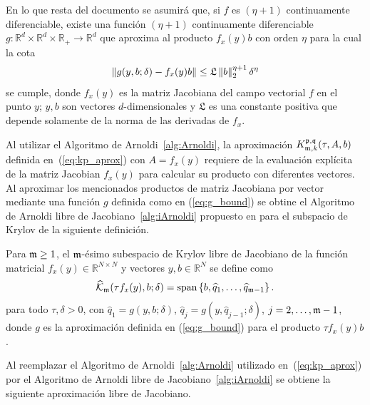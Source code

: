 En lo que resta del documento se asumirá que, si $f$ es $(\eta+1)$  continuamente diferenciable, existe una función $(\eta+1)$ continuamente diferenciable $g: \mathbb{R}^{d}\times \mathbb{R}^{d} \times \mathbb{R}_+ \to \mathbb{R}^{d}$ que aproxima al producto $f_x(y)b$ con orden $\eta$ para la cual la cota
\begin{equation} \label{eq:g_bound}
	\left\lVert g(y,b;\delta)-f_x(y)b \right\rVert \leq \mathfrak{L}\left\lVert b \right\rVert_2^{\eta+1}\delta^{\eta}
\end{equation}
se cumple, donde $f_x(y)$ es la matriz Jacobiana del campo vectorial $f$ en el punto $y$; $y,b$ son vectores $d$-dimensionales y $\mathfrak{L}$ es una constante positiva que depende solamente de la norma de las derivadas de $f_x$.

Al utilizar el Algoritmo de Arnoldi~\ref{alg:Arnoldi}, la aproximación $K_{\mathfrak{m},k}^{\mathfrak{p},\mathfrak{q}}(\tau,A,b)$ definida en~(\ref{eq:kp_aprox}) con $A=f_x(y)$ requiere de la evaluación explícita de la matriz Jacobian $f_x(y)$ para calcular su producto con diferentes vectores. Al aproximar los mencionados productos de matriz Jacobiana por vector mediante una función $g$ definida como en (\ref{eq:g_bound}) se obtine el Algoritmo de Arnoldi libre de Jacobiano~\ref{alg:iArnoldi} propuesto en \cite{brown1987local} para el subspacio de Krylov de la siguiente definición. 

\begin{definition}
	\cite{brown1987local} Para $\mathfrak{m}\geq 1$, el $\mathfrak{m}$-ésimo subespacio de Krylov libre de Jacobiano de la función matricial $f_x(y)\in\mathbb{R}^{N\times N}$
	y vectores $y,b\in\mathbb{R}^{N}$ se define como
	\[ \widehat{\mathcal{K}}_{\mathfrak{m}}(\tau f_x(y),b;\delta)=\mathrm{span} \left\{ b,\widehat{q}_1,\ldots,\widehat{q}_{\mathfrak{m}-1} \right\}. \]
	para todo $\tau, \delta > 0$, con $\widehat{q}_1=g(y,b;\delta)$, $\widehat{q}_j=g(y,\widehat{q}_{j-1};\delta)$, $j=2,\ldots,\mathfrak{m}-1$, donde $g$ es la aproximación definida en (\ref{eq:g_bound}) para el producto $\tau f_x(y)b$.
\end{definition}

Al reemplazar el Algoritmo de Arnoldi~\ref{alg:Arnoldi} utilizado en~(\ref{eq:kp_aprox}) por el Algoritmo de Arnoldi libre de Jacobiano~\ref{alg:iArnoldi} se obtiene la siguiente aproximación libre de Jacobiano.


